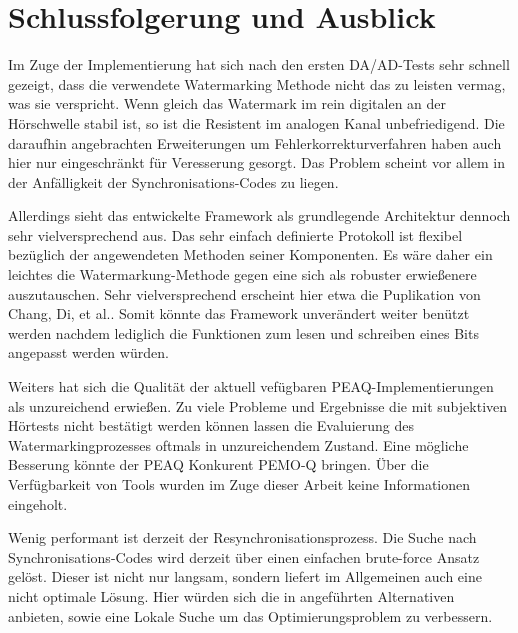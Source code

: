 \chapter{Schlussfolgerung und Ausblick}
\label{ch:ausblick}

Im Zuge der Implementierung hat sich nach den ersten DA/AD-Tests sehr schnell gezeigt, dass die verwendete Watermarking Methode\cite{xiang2007robust} nicht das zu leisten vermag, was sie verspricht. Wenn gleich das Watermark im rein digitalen an der Hörschwelle stabil ist, so ist die Resistent im analogen Kanal unbefriedigend. Die daraufhin angebrachten Erweiterungen um Fehlerkorrekturverfahren haben auch hier nur eingeschränkt für Veresserung gesorgt. Das Problem scheint vor allem in der Anfälligkeit der Synchronisations-Codes zu liegen. 

Allerdings sieht das entwickelte Framework als grundlegende Architektur dennoch sehr vielversprechend aus. Das sehr einfach definierte Protokoll ist flexibel bezüglich der angewendeten Methoden seiner Komponenten. Es wäre daher ein leichtes die Watermarkung-Methode gegen eine sich als robuster erwießenere auszutauschen. Sehr vielversprechend erscheint hier etwa die Puplikation von Chang, Di, et al.\cite{chang2012location}. Somit könnte das Framework unverändert weiter benützt werden nachdem lediglich die Funktionen zum lesen und schreiben eines Bits angepasst werden würden. 

Weiters hat sich die Qualität der aktuell vefügbaren PEAQ-Implementierungen als unzureichend erwießen. Zu viele Probleme und Ergebnisse die mit subjektiven Hörtests nicht bestätigt werden können lassen die Evaluierung des Watermarkingprozesses oftmals in unzureichendem Zustand. Eine mögliche Besserung könnte der PEAQ Konkurent PEMO-Q\cite{huber2006pemo} bringen. Über die Verfügbarkeit von Tools wurden im Zuge dieser Arbeit keine Informationen eingeholt. 

Wenig performant ist derzeit der Re\-synchron\-isations\-prozess. Die Suche nach Synchron\-isations-Codes wird derzeit über einen einfachen brute-force Ansatz gelöst. Dieser ist nicht nur langsam, sondern liefert im Allgemeinen auch eine nicht optimale Lösung. Hier würden sich die in \cite{steinebach2011re} angeführten Alternativen anbieten, sowie eine Lokale Suche um das Optimierungs\-problem zu verbessern. 
